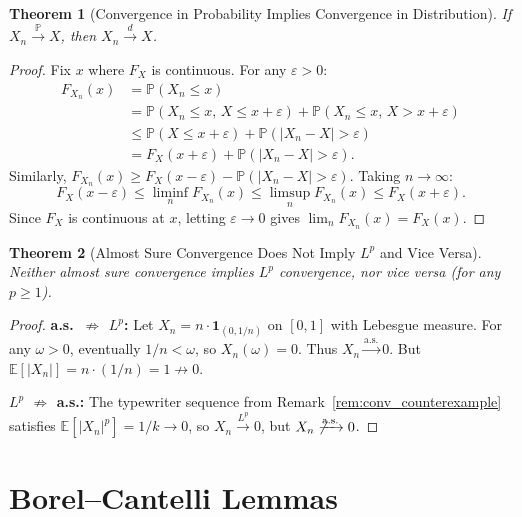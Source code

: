 \documentclass[11pt,a4paper]{article}
\theoremstyle{definition}
\theoremstyle{plain}
\newtheorem{theorem}{Theorem}[section]
\theoremstyle{remark}
\newcommand{\E}{\mathbb{E}}
\newcommand{\Prob}{\mathbb{P}}
\newcommand{\indicator}{\mathbf{1}}
\newcommand{\cas}{\xrightarrow{\text{a.s.}}}
\newcommand{\cprob}{\xrightarrow{\Prob}}
\newcommand{\clp}[1]{\xrightarrow{L^{#1}}}
\newcommand{\cdist}{\xrightarrow{d}}
\begin{document}
\begin{theorem}[Convergence in Probability Implies Convergence in Distribution]
\label{thm:prob_to_dist}
If $X_n \cprob X$, then $X_n \cdist X$.
\end{theorem}

\begin{proof}
Fix $x$ where $F_X$ is continuous. For any $\varepsilon > 0$:
\begin{align}
    F_{X_n}(x) &= \Prob(X_n \leq x) \nonumber\\
    &= \Prob(X_n \leq x,\, X \leq x + \varepsilon) + \Prob(X_n \leq x,\, X > x + \varepsilon) \nonumber\\
    &\leq \Prob(X \leq x + \varepsilon) + \Prob(|X_n - X| > \varepsilon) \nonumber\\
    &= F_X(x + \varepsilon) + \Prob(|X_n - X| > \varepsilon).
\end{align}
Similarly, $F_{X_n}(x) \geq F_X(x - \varepsilon) - \Prob(|X_n - X| > \varepsilon)$. Taking $n \to \infty$:
\begin{equation}
    F_X(x - \varepsilon) \leq \liminf_n F_{X_n}(x) \leq \limsup_n F_{X_n}(x) \leq F_X(x + \varepsilon).
\end{equation}
Since $F_X$ is continuous at $x$, letting $\varepsilon \to 0$ gives $\lim_n F_{X_n}(x) = F_X(x)$.
\end{proof}

\begin{theorem}[Almost Sure Convergence Does Not Imply $L^p$ and Vice Versa]
\label{thm:as_lp_no_implication}
Neither almost sure convergence implies $L^p$ convergence, nor vice versa (for any $p \geq 1$).
\end{theorem}

\begin{proof}
\textbf{a.s.\ $\not\Rightarrow$ $L^p$:} Let $X_n = n \cdot \indicator_{(0, 1/n)}$ on $[0,1]$ with Lebesgue measure. For any $\omega > 0$, eventually $1/n < \omega$, so $X_n(\omega) = 0$. Thus $X_n \cas 0$. But $\E[|X_n|] = n \cdot (1/n) = 1 \not\to 0$.

\textbf{$L^p$ $\not\Rightarrow$ a.s.:} The typewriter sequence from Remark~\ref{rem:conv_counterexample} satisfies $\E[|X_n|^p] = 1/k \to 0$, so $X_n \clp{p} 0$, but $X_n \not\cas 0$.
\end{proof}

\section{Borel--Cantelli Lemmas}
\label{sec:borel_cantelli}
\end{document}
